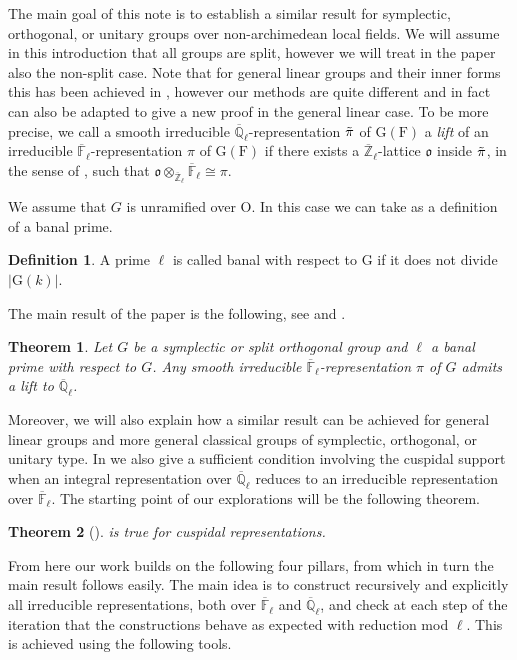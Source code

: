 \documentclass[10pt,a4paper]{article}
\newtheorem{theorem}{Theorem}
\theoremstyle{remark}
\theoremstyle{definition}
\newtheorem{definition}{Definition}
\newcommand{\fl}{{\overline{\mathbb{F}}_\ell}}
\newcommand{\ql}{{\overline{\mathbb{Q}}_\ell}}
\newcommand{\zl}{{\overline{\mathbb{Z}}_\ell}}
\newcommand{\bl}{\otimes_\zl\fl}
\newcommand{\fo}{\mathfrak{o}}
\newcommand{\tpi}{\Tilde{\pi}}
\newcommand{\FF}{\mathrm{F}}
\newcommand{\mG}{\mathrm{G}   }
\newcommand{\io}{\mathrm{O}}
\begin{document}
The main goal of this note is to establish a similar result for symplectic, orthogonal, or unitary groups over non-archimedean local fields. We will assume in this introduction that all groups are split, however we will treat in the paper also the non-split case. Note that for general linear groups and their inner forms this has been achieved in \cite{minguez2013representations}, however our methods are quite different and in fact can also be adapted to give a new proof in the general linear case. To be more precise, we call a smooth irreducible $\ql$-representation $\tpi$ of $\mG(\FF)$ a \emph{lift} of an irreducible $\fl$-representation $\pi$ of $\mG(\FF)$ if there exists a $\zl$-lattice $\fo$ inside $\tpi$, in the sense of \cite{Vig96}, such that $\fo\bl\cong\pi$.

We assume that $G$ is unramified over $\io$. In this case we can take \cite[Lemma 5.22]{Dat_Helm_Kurinczuk_Moss_2025} as a definition of a banal prime.
\begin{definition}
A prime $\ell$ is called banal with respect to $\mG$ if it does not divide $\lvert \mG(k)\rvert$.
\end{definition}
The main result of the paper is the following, see  and .
\begin{theorem}\label{T:main}
    Let $G$ be a symplectic or split orthogonal group and $\ell$ a banal prime with respect to $G$.
    Any smooth irreducible $\fl$-representation $\pi$ of $G$ admits a lift to $\ql$.
\end{theorem}
Moreover, we will also explain how a similar result can be achieved for general linear groups and more general classical groups of symplectic, orthogonal, or unitary type.
In  we also give a sufficient condition involving the cuspidal support when an integral representation over $\ql$ reduces to an irreducible representation over $\fl$.
The starting point of our explorations will be the following theorem.
\begin{theorem}[{\cite[Proposition 4.15]{Dat_Helm_Kurinczuk_Moss_2024}}]
     is true for cuspidal representations.
\end{theorem}
From here our work builds on the following four pillars, from which in turn the main result follows easily. The main idea is to construct recursively and explicitly all irreducible representations, both over $\fl$ and $\ql$, and check at each step of the iteration that the constructions behave as expected with reduction mod $\ell$. This is achieved using the following  tools.
\end{document}
